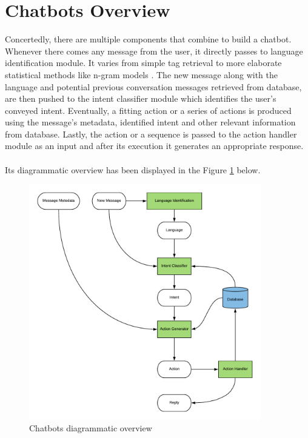 \section{Chatbots Overview}
Concertedly, there are multiple components that combine to build a chatbot. Whenever there comes any message from the user, it directly passes to language identification module. It varies from simple tag retrieval to more elaborate statistical methods like n-gram models \cite{ngram}. The new message along with the language and potential previous conversation messages retrieved from database, are then pushed to the intent classifier module which identifies the user's conveyed intent. Eventually, a fitting action or a series of actions is produced using the message’s metadata, identified intent and other relevant information from database. Lastly, the action or a sequence is passed to the action handler module as an input and after its execution it generates an appropriate response. \cite{designandimplementation} 
\\~\\
Its diagrammatic overview has been displayed in the Figure \ref{fig:chatbotDiagOverv} below.
\begin{figure}[h]
    \centering
    \includegraphics[width=0.9\textwidth]{img/overview.pdf}
    \caption{Chatbots diagrammatic overview \cite{designandimplementation}}
    \label{fig:chatbotDiagOverv}
\end{figure}


